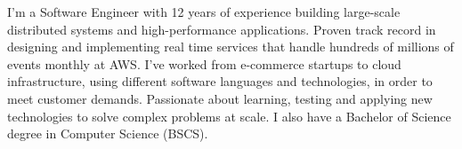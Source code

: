 %
%
%

\par{
	I'm a Software Engineer with 12 years of experience building large-scale distributed systems and high-performance applications. Proven track record in designing and implementing real time services that handle hundreds of millions of events monthly at AWS.
	I've worked from e-commerce startups to cloud infrastructure,
	using different software languages and technologies, in order to meet customer demands.
	Passionate about learning, testing and applying new technologies to solve complex problems at scale.
	I also have a Bachelor of Science degree in Computer Science (BSCS).\\
}
